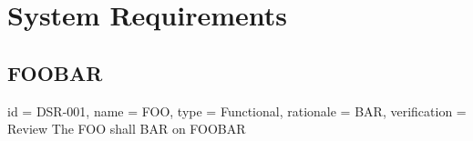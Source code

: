 \documentclass{article}
\begin{document}
\tableofcontents

\section{System Requirements}

\subsection{FOOBAR}

\begin{requirement}{
                id = DSR-001,
                name = FOO,
                type = Functional,
                rationale = BAR,
                verification = Review
        }
        The FOO shall BAR on FOOBAR
\end{requirement}
\end{document}

